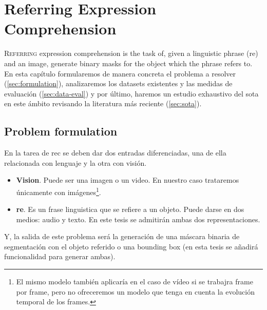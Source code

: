 

\chapter{Referring Expression Comprehension} \label{cha:rec}



\lettrine{R}{eferring} expression comprehension is the task of, given a
linguistic phrase (\gls{re}) and an image, generate binary masks for the object
which the phrase refers to. En esta capítulo formularemos de manera concreta el
problema a resolver (\vref{sec:formulation}), analizaremos los datasets
existentes y las medidas de evaluación (\vref{sec:data-eval}) y por último,
haremos un estudio exhaustivo del \gls{sota} en este ámbito revisando la
literatura más reciente (\vref{sec:sota}).


\section{Problem formulation} \label{sec:formulation}

En la tarea de \gls{rec} se deben dar dos entradas diferenciadas, una de ella
relacionada con lenguaje y la otra con visión.
\begin{itemize}
  \item \textbf{Vision}. Puede ser una imagen o un video. En nuestro caso
  trataremos únicamente con imágenes\footnote{El mismo modelo también aplicaría
  en el caso de vídeo si se trabajra frame por frame, pero no ofreceremos un
  modelo que tenga en cuenta la evolución temporal de los frames.}.
  \item \textbf{\gls{re}}. Es un frase linguistica que se refiere a un
  objeto. Puede darse en dos medios: audio y texto. En este tesis se admitirán
  ambas dos representaciones.
\end{itemize}
Y, la salida de este problema será la generación de una máscara binaria de
segmentación con el objeto referido o una bounding box (en esta tesis se
añadirá funcionalidad para generar ambas).

